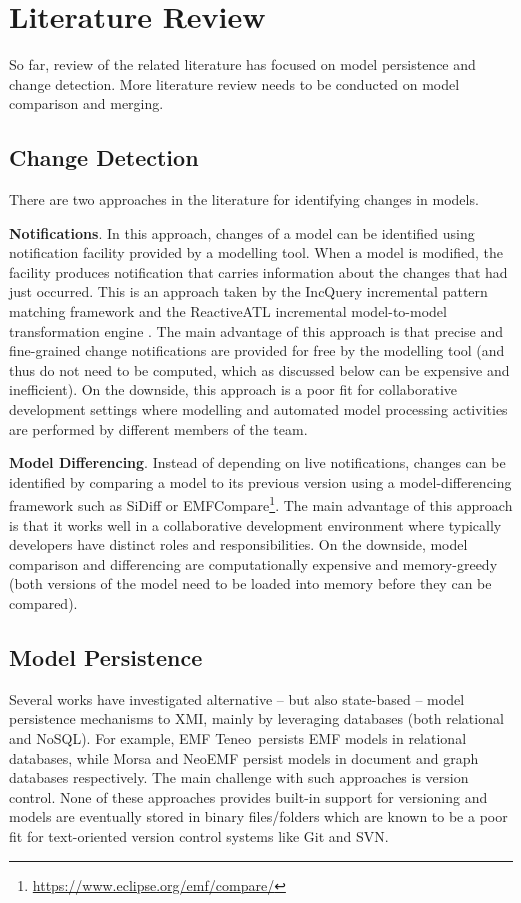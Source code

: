 \documentclass[12pt, a4paper]{report} \usepackage[titletoc]{appendix}
\begin{document}
\section{Literature Review}
\label{sec:literature_review}
So far, review of the related literature has focused on model persistence and change detection. More literature review needs to be conducted on model comparison and merging.  

\subsection{Change Detection}
\label{subsec:change_detection}
There are two approaches in the literature for identifying changes in models.

\textbf{Notifications}. In this approach, changes of a model can be identified using  notification facility provided by a modelling tool. When a model is modified, the facility produces notification that carries information about the changes that had just occurred. This is an approach taken by the IncQuery incremental pattern matching framework \cite{rath2012derived} and the ReactiveATL incremental model-to-model transformation engine \cite{ogunyomi2015property}. The main advantage of this approach is that precise and fine-grained change notifications are provided for free by the modelling tool (and thus do not need to be computed, which as discussed below can be expensive and inefficient). On the downside, this approach is a poor fit for collaborative development settings where modelling and automated model processing activities are performed by different members of the team.

\textbf{Model Differencing}. Instead of depending on live notifications, changes can be identified by comparing a model to its previous version using a model-differencing framework such as SiDiff \cite{kelter2005generic} or EMFCompare\footnote{\url{https://www.eclipse.org/emf/compare/}}. The main advantage of this approach is that it works well in a collaborative development environment where typically developers have distinct roles and responsibilities. On the downside, model comparison and differencing are computationally expensive and memory-greedy (both versions of the model need to be loaded into memory before they can be compared).

\subsection{Model Persistence}
\label{subsec:model_persistence}
Several works have investigated alternative -- but also state-based -- model persistence mechanisms to XMI, mainly by leveraging databases (both relational and NoSQL). For example, EMF Teneo\,\cite{eclipse2017teneo} persists EMF models in relational databases, while Morsa \cite{pagan2011morsa} and NeoEMF \cite{daniel2016neoemf} persist models in document and graph databases respectively. The main challenge with such approaches is version control. None of these approaches provides built-in support for versioning and models are eventually stored in binary files/folders which are known to be a poor fit for text-oriented version control systems like Git and SVN.
\end{document}
